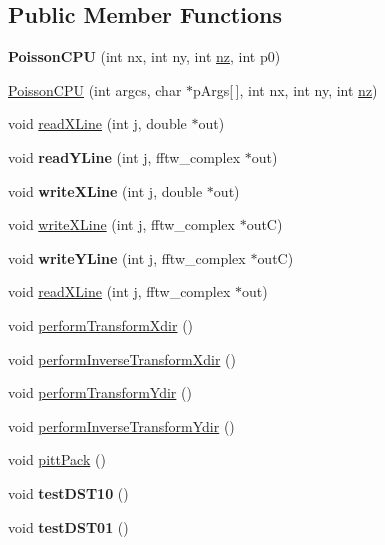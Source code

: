 \subsection*{Public Member Functions}
\begin{DoxyCompactItemize}
\item 
\mbox{\label{classPoissonCPU_ad12c7cfba0bff9689ef3e6fc6fec6719}} 
{\bfseries Poisson\+C\+PU} (int nx, int ny, int \mbox{\hyperlink{classPencilDcmp_aedb528abdba6fa4a541af83f851e11c8}{nz}}, int p0)
\item 
\mbox{\hyperlink{classPoissonCPU_a3d0e8115ad16749dee9140ce1a6093a4}{Poisson\+C\+PU}} (int argcs, char $\ast$p\+Args\mbox{[}$\,$\mbox{]}, int nx, int ny, int \mbox{\hyperlink{classPencilDcmp_aedb528abdba6fa4a541af83f851e11c8}{nz}})
\item 
void \mbox{\hyperlink{classPoissonCPU_a0530ee95c01660914bdd8a1feb04e2e2}{read\+X\+Line}} (int j, double $\ast$out)
\item 
\mbox{\label{classPoissonCPU_ae05b7bb5869cff8f945cac4451ecd7d1}} 
void {\bfseries read\+Y\+Line} (int j, fftw\+\_\+complex $\ast$out)
\item 
\mbox{\label{classPoissonCPU_a55147254d8c6dca011a2414058341f7c}} 
void {\bfseries write\+X\+Line} (int j, double $\ast$out)
\item 
void \mbox{\hyperlink{classPoissonCPU_a4fdd72c648875fa0a4872449e14b4dbf}{write\+X\+Line}} (int j, fftw\+\_\+complex $\ast$outC)
\item 
\mbox{\label{classPoissonCPU_aeef9a5d2ae50e05cb0068d3904f9ae06}} 
void {\bfseries write\+Y\+Line} (int j, fftw\+\_\+complex $\ast$outC)
\item 
void \mbox{\hyperlink{classPoissonCPU_a90b4af0b201795377ccca1b4cfa3a914}{read\+X\+Line}} (int j, fftw\+\_\+complex $\ast$out)
\item 
void \mbox{\hyperlink{classPoissonCPU_a63f9ffc159144ed2cf1f33052e87b132}{perform\+Transform\+Xdir}} ()
\item 
void \mbox{\hyperlink{classPoissonCPU_a47781a3401da674f472d1b5d9d70d5bb}{perform\+Inverse\+Transform\+Xdir}} ()
\item 
void \mbox{\hyperlink{classPoissonCPU_a0e73fc27938db2321df283e4e515c184}{perform\+Transform\+Ydir}} ()
\item 
void \mbox{\hyperlink{classPoissonCPU_ae508a36c9a62af97bec476248e86ad0f}{perform\+Inverse\+Transform\+Ydir}} ()
\item 
void \mbox{\hyperlink{classPoissonCPU_af2ae0f3ef39f65a826872ab7ef777d74}{pitt\+Pack}} ()
\item 
\mbox{\label{classPoissonCPU_ad4f50e8c6c1917767b6fdd961886929a}} 
void {\bfseries test\+D\+S\+T10} ()
\item 
\mbox{\label{classPoissonCPU_a6d0e5c99b9de829cc79051be09f8648b}} 
void {\bfseries test\+D\+S\+T01} ()
\end{DoxyCompactItemize}

